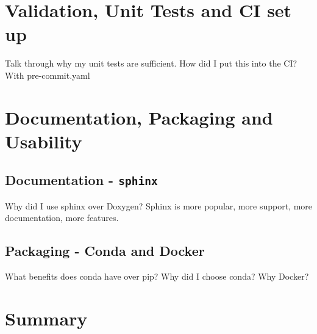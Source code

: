 \documentclass[a4paper,11pt]{article}
\newcommand{\inlinecode}[1]{\lstinline{#1}}
\begin{document}
\section{Validation, Unit Tests and CI set up}\label{sec:validation-unit-tests-and-ci-set-up}
Talk through why my unit tests are sufficient.
How did I put this into the CI? With pre-commit.yaml


\section{Documentation, Packaging and Usability}\label{sec:documentation-packaging-and-usability}
\subsection{Documentation - \inlinecode{sphinx}}\label{subsec:documentation-sphinx}
Why did I use sphinx over Doxygen? Sphinx is more popular, more support, more documentation, more features.

\subsection{Packaging - Conda and Docker}\label{subsec:packaging-pypi}
What benefits does conda have over pip? Why did I choose conda?
Why Docker?

\section{Summary}
\label{sec:conclusion}
\end{document}

